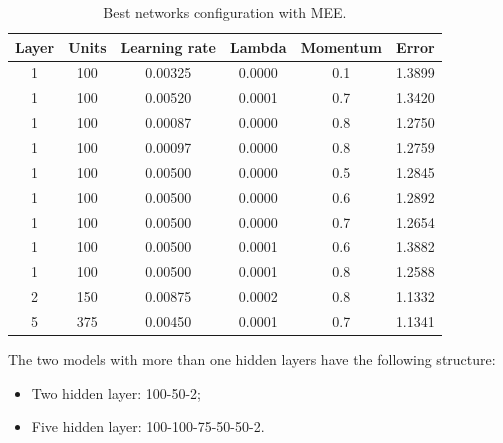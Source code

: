 \begin{table}[h!]
	\centering
	\begin{tabular}{|c|c|c|c|c|c|}
		\hline
		\textbf{Layer}& \textbf{Units}& \textbf{Learning rate} & \multicolumn{1}{l|}{\textbf{Lambda}} & \textbf{Momentum} & \textbf{Error}\\ \hline
			1 & 100 & 0.00325 & 0.0000 & 0.1  & 1.3899 \\
			1 & 100 & 0.00520 & 0.0001 & 0.7  & 1.3420 \\
			1 & 100 & 0.00087 & 0.0000 & 0.8  & 1.2750 \\
			1 & 100 & 0.00097 & 0.0000 & 0.8  & 1.2759 \\
			1 & 100 & 0.00500 & 0.0000 & 0.5  & 1.2845 \\
			1 & 100 & 0.00500 & 0.0000 & 0.6  & 1.2892 \\
			1 & 100 & 0.00500 & 0.0000 & 0.7  & 1.2654 \\
			1 & 100 & 0.00500 & 0.0001 & 0.6  & 1.3882 \\
			1 & 100 & 0.00500 & 0.0001 & 0.8  & 1.2588 \\
			2 & 150 & 0.00875 & 0.0002 & 0.8  & 1.1332 \\
			5 & 375 & 0.00450 & 0.0001 & 0.7  & 1.1341 \\
		  \hline
	\end{tabular}
		\caption{Best networks configuration with MEE.}
\end{table}

The two models with more than one hidden layers have the following structure:
\begin{itemize}
	\item Two hidden layer: 100-50-2;
	\item Five hidden layer: 100-100-75-50-50-2.
\end{itemize}

